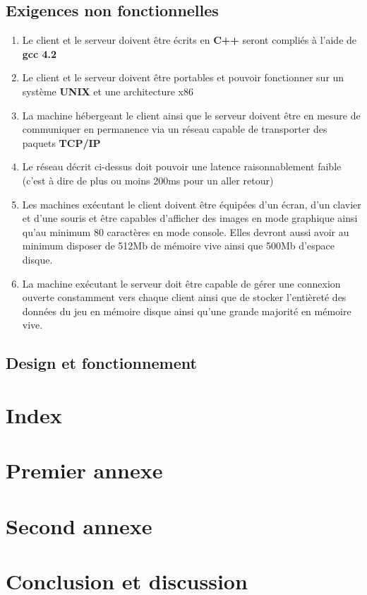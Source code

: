 \documentclass[a4paper]{article}
\begin{document}
\subsection{Exigences non fonctionnelles}
\label{enf}

\begin{enumerate}
\item Le client et le serveur doivent être écrits en \textbf{C++} seront compliés à l'aide de \textbf{gcc 4.2}
\item Le client et le serveur doivent être portables et pouvoir fonctionner sur un système \textbf{UNIX} et une architecture x86
\item La machine hébergeant le client ainsi que le serveur doivent être en mesure de communiquer en permanence via un réseau capable de transporter des paquets \textbf{TCP/IP}
\item Le réseau décrit ci-dessus doit pouvoir une latence raisonnablement faible (c'est à dire de plus ou moins 200ms pour un aller retour)
\item Les machines exécutant le client doivent être équipées d'un écran, d'un clavier et d'une souris et être capables d'afficher des images en mode graphique ainsi qu'au minimum 80 caractères en mode console. Elles devront aussi avoir au minimum disposer de 512Mb de mémoire vive ainsi que 500Mb d'espace disque.
\item La machine exécutant le serveur doit être capable de gérer une connexion ouverte constamment vers chaque client ainsi que de stocker l'entièreté des données du jeu en mémoire disque ainsi qu'une grande majorité en mémoire vive.
\end{enumerate}


\subsection{Design et fonctionnement}
\section{Index}

\appendix

\section{Premier annexe}
\section{Second annexe}

\section{Conclusion et discussion}

\tableofcontents    %
\listoffigures        %
\listoftables        %

\end{document}
